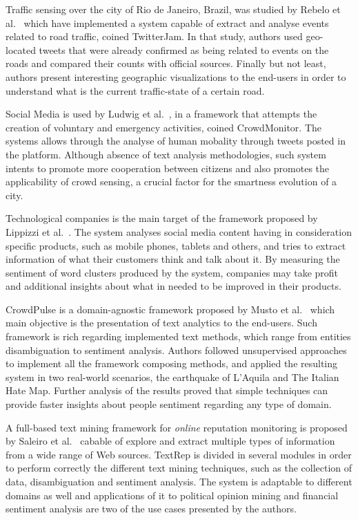 Traffic sensing over the city of Rio de Janeiro, Brazil, was studied by Rebelo et al.~\cite{rebelo2015twitterjam} which have implemented a system capable of extract and analyse events related to road traffic, coined  TwitterJam. In that study, authors used geo-located tweets that were already confirmed as being related to events on the roads and compared their counts with official sources. Finally but not least, authors present interesting geographic visualizations to the end-users in order to understand what is the current traffic-state of a certain road.

Social Media is used by Ludwig et al.~\cite{kn:Ludwig2015}, in a framework that attempts the creation of voluntary and emergency activities, coined CrowdMonitor. The systems allows through the analyse of human mobality through tweets posted in the platform. Although absence of text analysis methodologies, such system intents to promote more cooperation between citizens and also promotes the applicability of crowd sensing, a crucial factor for the smartness evolution of a city.

Technological companies is the main target of the framework proposed by Lippizzi et al.~\cite{kn:Lipizzi2015}. The system analyses social media content having in consideration specific products, such as mobile phones, tablets and others, and tries to extract information of what their customers think and talk about it. By measuring the sentiment of word clusters produced by the system, companies may take profit and additional insights about what in needed to be improved in their products.

CrowdPulse is a domain-agnostic framework proposed by Musto et al.~\cite{musto2015crowdpulse} which main objective is the presentation of text analytics to the end-users. Such framework is rich regarding implemented text methods, which range from entities disambiguation to sentiment analysis. Authors followed unsupervised approaches to implement all the framework composing methods, and applied the resulting system in two real-world scenarios, the earthquake of L'Aquila and The Italian Hate Map. Further analysis of the results proved that simple techniques can provide faster insights about people sentiment regarding any type of domain.

A full-based text mining framework for \textit{online} reputation monitoring is proposed by Saleiro et al.~\cite{saleiro2017texrep} cabable of explore and extract multiple types of information from a wide range of Web sources. TextRep is divided in several modules in order to perform correctly the different text mining techniques, such as the collection of data, disambiguation and sentiment analysis. The system is adaptable to different domains as well and applications of it to political opinion mining and financial sentiment analysis are two of the use cases presented by the authors.

